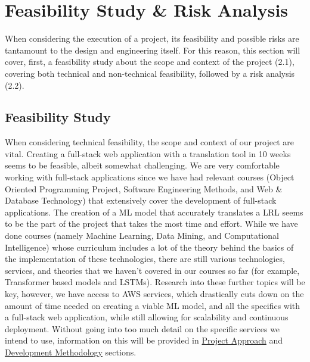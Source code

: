 \section{Feasibility Study \& Risk Analysis}
When considering the execution of a project, its feasibility and possible risks are tantamount to the design and engineering itself. For this reason, this section will cover, first, a feasibility study about the scope and context of the project (2.1), covering both technical and non-technical feasibility, followed by a risk analysis (2.2).

\label{sec:feasability&risk}
\subsection{Feasibility Study}

\indent \indent When considering technical feasibility, the scope and context of our project are vital. Creating a full-stack web application with a translation tool in 10 weeks seems to be feasible, albeit somewhat challenging. We are very comfortable working with full-stack applications since we have had relevant courses (Object Oriented Programming Project, Software Engineering Methods, and Web \& Database Technology) that extensively cover the development of full-stack applications. The creation of a ML model that accurately translates a LRL seems to be the part of the project that takes the most time and effort. While we have done courses (namely Machine Learning, Data Mining, and Computational Intelligence) whose curriculum includes a lot of the theory behind the basics of the implementation of these technologies, there are still various technologies, services, and theories that we haven’t covered in our courses so far (for example, Transformer based models and \gls{LSTMs}). Research into these further topics will be key, however, we have access to AWS services, which drastically cuts down on the amount of time needed on creating a viable ML model, and all the specifics with a full-stack web application, while still allowing for scalability and continuous deployment. Without going into too much detail on the specific services we intend to use, information on this will be provided in \href{#sec:projectapproach}{Project Approach} and \href{#sec:developmentmethodology}{Development Methodology} sections.  

